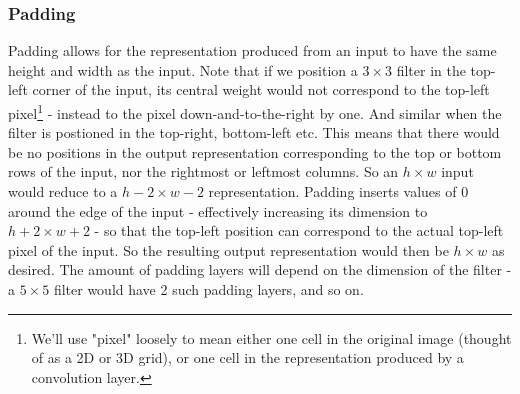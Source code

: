 \documentclass[11pt]{article} %
\theoremstyle{plain}
\theoremstyle{definition}
\begin{document}
\subsubsection{Padding}
Padding allows for the representation produced from an input to have the same height and width as the input. Note that if we position a \(3 \times 3\) filter in the top-left corner of the input, its central weight would not correspond to the top-left pixel\footnote{We'll use "pixel" loosely to mean either one cell in the original image (thought of as a 2D or 3D grid), or one cell in the representation produced by a convolution layer.} - instead to the pixel down-and-to-the-right by one. And similar when the filter is postioned in the top-right, bottom-left etc. This means that there would be no positions in the output representation corresponding to the top or bottom rows of the input, nor the rightmost or leftmost columns. So an \(h \times w \) input would reduce to a \(h-2 \times w-2 \) representation. Padding inserts values of 0 around the edge of the input - effectively increasing its dimension to \(h+2 \times w+2 \) - so that the top-left position can correspond to the actual top-left pixel of the input. So the resulting output representation would then be \(h \times w \) as desired. The amount of padding layers will depend on the dimension of the filter - a \(5 \times 5\) filter would have 2 such padding layers, and so on.
\end{document}
